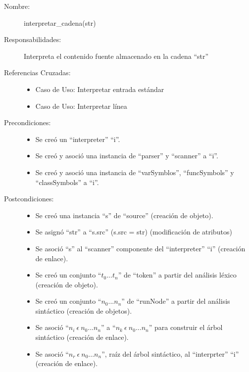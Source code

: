 	\begin{description}
		\item [Nombre:] interpretar\_cadena(str)
		\item [Responsabilidades:] Interpreta el contenido fuente almacenado en la cadena ``str''
		\item [Referencias Cruzadas: ] \hfill
      \begin {itemize}
      \item Caso de Uso: Interpretar entrada estándar 
      \item Caso de Uso: Interpretar línea
      \end{itemize}
      \item [Precondiciones:] \hfill
      \begin {itemize}
      \item Se creó un ``interpreter'' ``i''.
      \item Se creó y asoció una instancia de ``parser'' y ``scanner'' a ``i''.
      \item Se creó y asoció una instancia de ``varSymblos'', ``funcSymbols'' y ``classSymbols'' a ``i''.
      \end{itemize}
      \item [Postcondiciones:] \hfill
      \begin {itemize}
         \item Se creó una instancia ``s'' de ``source'' (creación de objeto).
         \item Se asignó ``str'' a ``s.src'' (s.src = str) (modificación de atributos)
         \item Se asoció ``s'' al ``scanner'' componente del ``interpreter'' ``i'' (creación de enlace). 
         \item Se creó un conjunto ``$t_0...t_n$'' de ``token'' a partir del análisis léxico (creación de objeto).
         \item Se creó un conjunto ``$n_0...n_n$'' de ``runNode'' a partir del análisis sintáctico (creación de objetos).
         \item Se asoció ``$n_i\ \epsilon\ n_0...n_n$'' a ``$n_k\ \epsilon\ n_0...n_n$'' para construir el árbol sintáctico (creación de enlace).
         \item Se asoció  ``$n_r\ \epsilon\ n_0...n_n$'', raíz del árbol sintáctico, al ``interprter'' ``i'' (creación de enlace).

\end{itemize}
\end{description}
